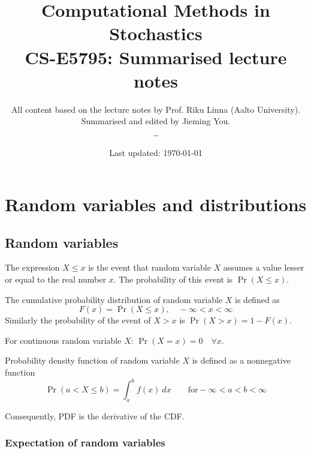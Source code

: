 \documentclass[letterpaper, 12pt]{article}
\newcommand{\1}{\mathds{1}} %
\theoremstyle{definition}
\begin{document}

\title{Computational Methods in Stochastics \\[1em]
  \normalsize CS-E5795: Summarised lecture notes }


\author{\normalsize All content based on the lecture notes by Prof. Riku Linna (Aalto University).\\[-0.4em]
  \normalsize Summarised and edited by Jieming You. \\ \dots}
\date{\normalsize\vspace{-1ex} Last updated: \today}


\maketitle
\section{Random variables and distributions}

\subsection{Random variables}

The expression ${X \leq x}$ is the event that random variable $X$ assumes a value lesser or equal to the real number $x$. The probability of this event is $\Pr(X \leq x)$.

The cumulative probability distribution of random variable $X$ is defined as
\[
  F(x) = \Pr (X \leq x), \quad -\infty < x < \infty
\]
Similarly the probability of the event of $X > x$ is $\Pr (X > x) = 1-F(x)$.

For continuous random variable $X$: $\Pr(X = x) = 0 \quad \forall x$.

Probability density function of random variable $X$ is defined as a nonnegative function
\[
  \Pr(a < X \leq b) = \int_a^b f(x)~dx \qquad \text{for} -\infty < a < b < \infty
\]

Consequently, PDF is the derivative of the CDF.

\subsubsection{Expectation of random variables}
\end{document}
